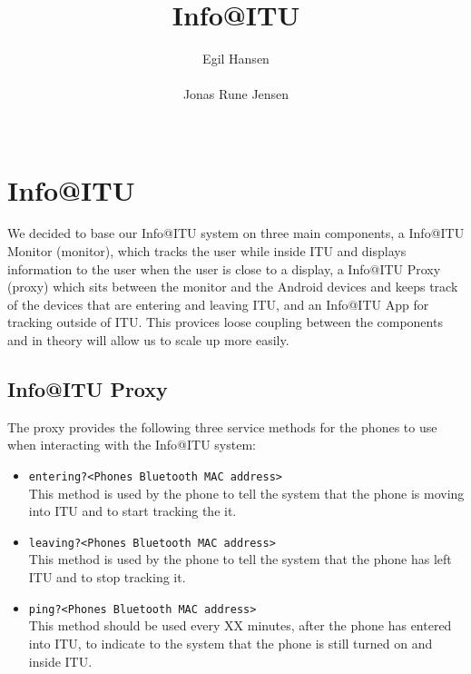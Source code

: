 \documentclass{ubicomp2011}
\begin{document}
\setlength{\paperheight}{11in}
\setlength{\paperwidth}{8.5in}
\setlength{\pdfpageheight}{\paperheight}
\setlength{\pdfpagewidth}{\paperwidth}

\toappear{}



\title{Info@ITU}
\author{
  \alignauthor Egil Hansen\\
    \\
 \alignauthor Jonas Rune Jensen\\
    \\
    }
    
\maketitle


\section{Info@ITU}
We decided to base our Info@ITU system on three main components, a Info@ITU Monitor (monitor), which tracks the user while inside ITU and displays information to the user when the user is close to a display, a Info@ITU Proxy (proxy) which sits between the monitor and the Android devices and keeps track of the devices that are entering and leaving ITU, and an Info@ITU App for tracking outside of ITU. This provices loose coupling between the components and in theory will allow us to scale up more easily.

\subsection{Info@ITU Proxy}
The proxy provides the following three service methods for the phones to use when interacting with the Info@ITU system:

\begin{itemize}
\item \texttt{entering?<Phones Bluetooth MAC address>}\\
This method is used by the phone to tell the system that the phone is moving into ITU and to start tracking the it.
\item \texttt{leaving?<Phones Bluetooth MAC address>}\\
This method is used by the phone to tell the system that the phone has left ITU and to stop tracking it.
\item \texttt{ping?<Phones Bluetooth MAC address>}\\
This method should be used every XX minutes, after the phone has entered into ITU, to indicate to the system that the phone is still turned on and inside ITU.
\end{itemize}
\end{document}
